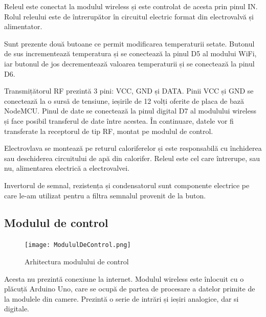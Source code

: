 \vspace{1em}

	Releul este conectat la modulul wireless și este controlat de acesta prin pinul IN. Rolul releului este de întrerupător în circuitul electric format din electrovalvă și alimentator.

\vspace{1em}

	Sunt prezente două butoane ce permit modificarea temperaturii setate. Butonul de sus incrementează temperatura și se conectează la pinul D5 al modului WiFi, iar butonul de jos decrementează valoarea temperaturii și se conectează la pinul D6.

\vspace{1em}

	Transmițătorul RF prezintă 3 pini: VCC, GND și DATA. Pinii VCC și GND se conectează la o sursă de tensiune, ieșirile de 12 volți oferite de placa de bază NodeMCU. Pinul de date se conectează la pinul digital D7 al modulului wireless și face posibil transferul de date între acestea. În continuare, datele vor fi transferate la receptorul de tip RF, montat pe modulul de control.  

\vspace{1em}

	Electrovlava se montează pe returul caloriferelor și este responsabilă cu închiderea sau deschiderea circuitului de apă din calorifer. Releul este cel care întrerupe, sau nu, alimentarea electrică a electrovalvei.

\vspace{1em}

	Invertorul de semnal, rezistența și condensatorul sunt componente electrice pe care le-am utilizat pentru a filtra semnalul provenit de la buton.  

\subsection{Modulul de control}

\begin{figure}[H]
   	\centering
    	\texttt{[image: ModululDeControl.png]}
	\caption{Arhitectura modulului de control}
\end{figure}

	Acesta nu prezintă conexiune la internet. Modulul wireless este înlocuit cu o plăcuță Arduino Uno, care se ocupă de partea de procesare a datelor primite de la modulele din camere. Prezintă o serie de intrări și ieșiri analogice, dar si digitale. 

